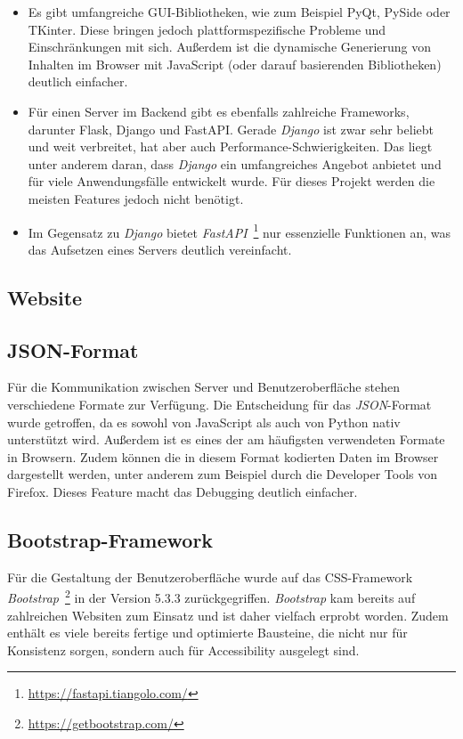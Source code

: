 \begin{itemize}
    \item Es gibt umfangreiche GUI-Bibliotheken, wie zum Beispiel PyQt, PySide oder TKinter. Diese bringen jedoch plattformspezifische Probleme und Einschränkungen mit sich.
    Außerdem ist die dynamische Generierung von Inhalten im Browser mit JavaScript (oder darauf basierenden Bibliotheken) deutlich einfacher.
    \item Für einen Server im Backend gibt es ebenfalls zahlreiche Frameworks, darunter Flask, Django und FastAPI.
    Gerade \textit{Django} ist zwar sehr beliebt und weit verbreitet, hat aber auch Performance-Schwierigkeiten.
    Das liegt unter anderem daran, dass \textit{Django} ein umfangreiches Angebot anbietet und für viele Anwendungsfälle entwickelt wurde.
    Für dieses Projekt werden die meisten Features jedoch nicht benötigt.
    \item Im Gegensatz zu \textit{Django} bietet \textit{FastAPI}~\footnote{\hspace{1.5mm}\url{https://fastapi.tiangolo.com/}} nur essenzielle Funktionen an, was das Aufsetzen eines Servers deutlich vereinfacht.
\end{itemize}

\subsection{Website}



\subsection{JSON-Format}

Für die Kommunikation zwischen Server und Benutzeroberfläche stehen verschiedene Formate zur Verfügung. Die Entscheidung für das \textit{JSON}-Format wurde getroffen, 
da es sowohl von JavaScript als auch von Python nativ unterstützt wird. Außerdem ist es eines der am häufigsten verwendeten Formate in Browsern.
Zudem können die in diesem Format kodierten Daten im Browser dargestellt werden, unter anderem
zum Beispiel durch die Developer Tools von Firefox. Dieses Feature macht das Debugging deutlich einfacher. 

\subsection{Bootstrap-Framework}

Für die Gestaltung der Benutzeroberfläche wurde auf das CSS-Framework \textit{Bootstrap}~\footnote{\hspace{1.5mm}\url{https://getbootstrap.com/}} in der Version 5.3.3 zurückgegriffen.
\textit{Bootstrap} kam bereits auf zahlreichen Websiten zum Einsatz und ist daher vielfach erprobt worden.
Zudem enthält es viele bereits fertige und optimierte Bausteine, die nicht nur für Konsistenz sorgen, sondern auch für Accessibility ausgelegt sind. 
